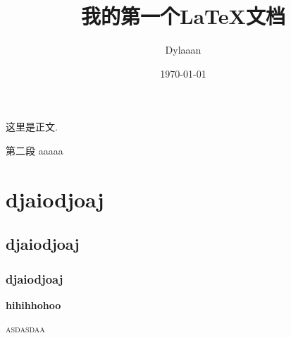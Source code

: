 \documentclass[5pt, a4paper, oneside]{ctexart}
\title{我的第一个\LaTeX 文档}
\author{Dylaaan}
\date{\today}
\begin{document}
\maketitle

\tableofcontents

这里是正文. 

第二段
\newpage
aaaaa

\section*{djaiodjoaj}
\subsection*{djaiodjoaj}
\subsubsection*{djaiodjoaj}
\textbf{hihihhohoo}

\textsc{asdasdaa}
\end{document}
